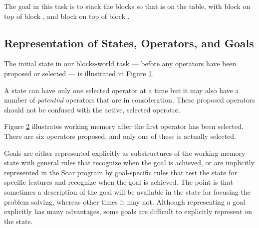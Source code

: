 The goal in this task is to stack the blocks so that  is on the table, with block  on top of block , and block  on top of block .

\subsection{Representation of States, Operators, and Goals}
\label{OVERVIEW-ps-representation}

The initial state in our blocks-world task --- before any operators have been proposed or selected --- is illustrated in Figure \ref{fig:ab-wmem}.

\begin{figure}
	\label{fig:ab-wmem}
\end{figure}

A state can have only one selected operator at a time but it may also have a number of \emph{potential} operators that are in consideration. These proposed operators should not be confused with the active, selected operator.

Figure \ref{fig:ab-wmem2} illustrates working memory after the first operator has been selected. There are six operators proposed, and only one of these is actually selected.

\begin{figure}
	\label{fig:ab-wmem2}
\end{figure}

Goals are either represented explicitly as substructures of the working memory state with general rules that recognize when the goal is achieved, or are implicitly represented in the Soar program by goal-specific rules that test the state for specific features and recognize when the goal is achieved.  The point is that sometimes a description of the goal will be available in the state for focusing the problem solving, whereas other times it may not.  Although representing a goal explicitly has many advantages, some goals are difficult to explicitly represent on the state.

